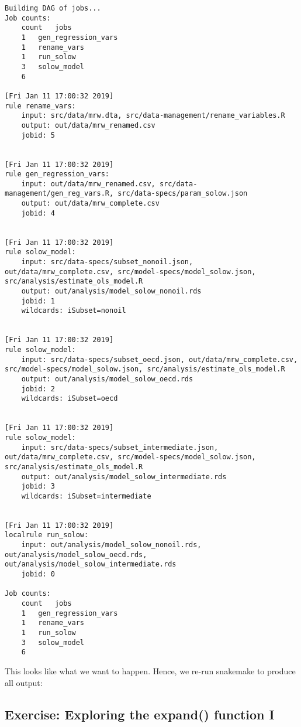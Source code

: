 \documentclass[]{book}
\newenvironment{Shaded}{\begin{snugshade}}{\end{snugshade}}
\newcommand{\KeywordTok}[1]{\textcolor[rgb]{0.13,0.29,0.53}{\textbf{{#1}}}}
\newcommand{\NormalTok}[1]{{#1}}
\theoremstyle{definition}
\theoremstyle{definition}
\theoremstyle{definition}
\theoremstyle{remark}
\begin{document}
\begin{verbatim}
Building DAG of jobs...
Job counts:
    count   jobs
    1   gen_regression_vars
    1   rename_vars
    1   run_solow
    3   solow_model
    6

[Fri Jan 11 17:00:32 2019]
rule rename_vars:
    input: src/data/mrw.dta, src/data-management/rename_variables.R
    output: out/data/mrw_renamed.csv
    jobid: 5


[Fri Jan 11 17:00:32 2019]
rule gen_regression_vars:
    input: out/data/mrw_renamed.csv, src/data-management/gen_reg_vars.R, src/data-specs/param_solow.json
    output: out/data/mrw_complete.csv
    jobid: 4


[Fri Jan 11 17:00:32 2019]
rule solow_model:
    input: src/data-specs/subset_nonoil.json, out/data/mrw_complete.csv, src/model-specs/model_solow.json, src/analysis/estimate_ols_model.R
    output: out/analysis/model_solow_nonoil.rds
    jobid: 1
    wildcards: iSubset=nonoil


[Fri Jan 11 17:00:32 2019]
rule solow_model:
    input: src/data-specs/subset_oecd.json, out/data/mrw_complete.csv, src/model-specs/model_solow.json, src/analysis/estimate_ols_model.R
    output: out/analysis/model_solow_oecd.rds
    jobid: 2
    wildcards: iSubset=oecd


[Fri Jan 11 17:00:32 2019]
rule solow_model:
    input: src/data-specs/subset_intermediate.json, out/data/mrw_complete.csv, src/model-specs/model_solow.json, src/analysis/estimate_ols_model.R
    output: out/analysis/model_solow_intermediate.rds
    jobid: 3
    wildcards: iSubset=intermediate


[Fri Jan 11 17:00:32 2019]
localrule run_solow:
    input: out/analysis/model_solow_nonoil.rds, out/analysis/model_solow_oecd.rds, out/analysis/model_solow_intermediate.rds
    jobid: 0

Job counts:
    count   jobs
    1   gen_regression_vars
    1   rename_vars
    1   run_solow
    3   solow_model
    6
\end{verbatim}

This looks like what we want to happen. Hence, we re-run snakemake to
produce all output:

\begin{Shaded}
\end{Shaded}

\subsection*{Exercise: Exploring the expand() function
I}\label{exercise-exploring-the-expand-function-i}
\end{document}
